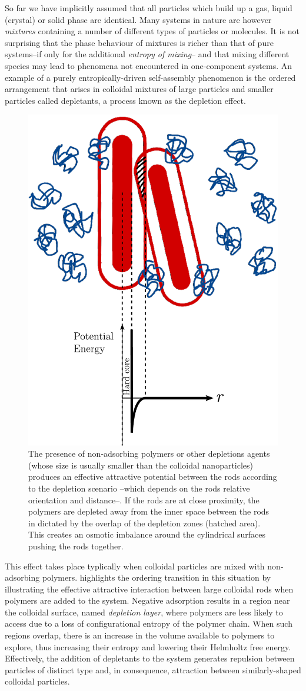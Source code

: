 So far we have implicitly assumed that all particles which build up a gas, liquid (crystal) or solid phase are identical. Many systems in nature are however {\em mixtures} containing a number of different types of particles or molecules. It is not surprising that the phase behaviour of mixtures is richer than that of pure systems--if only for the additional {\em entropy of mixing}-- and that mixing different species may lead to  phenomena not encountered in one-component systems. An example of a purely entropically-driven self-assembly phenomenon is the ordered arrangement that arises in colloidal mixtures of large particles and smaller particles called depletants, a process known as the depletion effect.

\begin{figure}
\includegraphics[width= 0.4 \columnwidth]{figures/chapter-1/depletion}
\caption[The presence of non-adsorbing polymers or other depletions agents (whose size is usually smaller than the colloidal nanoparticles)]{ \label{introfig2} The presence of non-adsorbing polymers or other depletions agents (whose size is usually smaller than the colloidal nanoparticles) produces an effective attractive potential between the rods according to the depletion scenario --which depends on the rods relative orientation and distance--. If the rods are at close proximity, the polymers are depleted away from the inner space between the rods in dictated by the overlap of the depletion zones (hatched area). This creates an osmotic imbalance around the cylindrical surfaces pushing the rods together.  }
\end{figure}

This effect takes place typlically when colloidal particles are mixed with non-adsorbing polymers.  highlights the ordering transition in this situation by illustrating the effective attractive interaction between large colloidal rods when polymers are added to the system. Negative adsorption results in a region near the colloidal surface, named {\em depletion layer}, where polymers are less likely to access due to a loss of configurational entropy of the polymer chain. When such regions overlap, there is an increase in the volume available to polymers to explore, thus increasing their entropy and lowering their Helmholtz free energy. Effectively, the addition of depletants to the system generates repulsion between particles of distinct type and, in consequence, attraction between similarly-shaped colloidal particles.

